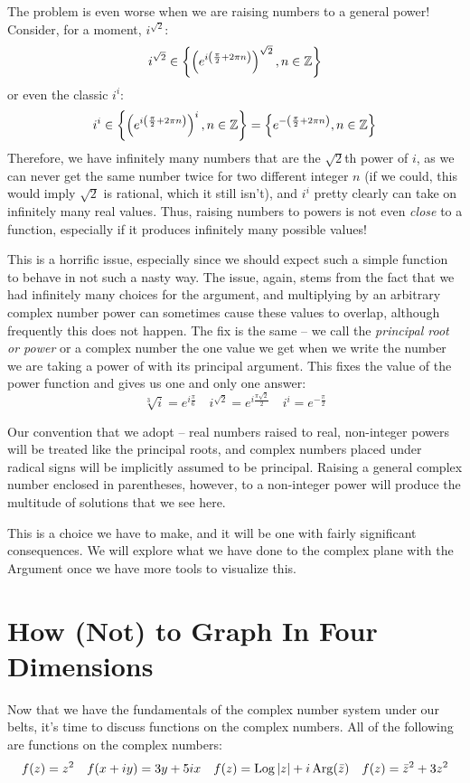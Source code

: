 The problem is even worse when we are raising numbers to a general power! Consider, for a moment, $i^{\sqrt{2}}$:
\[
    i^{\sqrt{2}} \in \left\{ \left(e^{i \left(\frac{\pi}{2} + 2\pi n \right) } \right)^{\sqrt{2}}, n \in \mathbb Z \right\}
\]
or even the classic $i^i$:
\[
    i^i \in \left\{ \left(e^{i \left(\frac{\pi}{2} + 2\pi n \right) } \right)^i, n \in \mathbb Z \right\} = \left\{ e^{- \left(\frac{\pi}{2} + 2\pi n \right) } , n \in \mathbb Z \right\}
\]
Therefore, we have infinitely many numbers that are the $\sqrt{2}$th power of $i$, as we can never get the same number twice for two different integer $n$ (if we could, this would imply $\sqrt{2}$ is rational, which it still isn't), and $i^i$ pretty clearly can take on infinitely many real values. Thus, raising numbers to powers is not even \textit{close} to a function, especially if it produces infinitely many possible values!

This is a horrific issue, especially since we should expect such a simple function to behave in not such a nasty way. The issue, again, stems from the fact that we had infinitely many choices for the argument, and multiplying by an arbitrary complex number power can sometimes cause these values to overlap, although frequently this does not happen. The fix is the same -- we call the \textit{principal root or power} or a complex number the one value we get when we write the number we are taking a power of with its principal argument. This fixes the value of the power function and gives us one and only one answer:
\[
    \sqrt[3]{i} = e^{i \frac{\pi}{6}} \quad i^{\sqrt{2}} = e^{i \frac{\pi \sqrt{2}}{2}} \quad i^i = e^{-\frac{\pi}{2}}
\]

Our convention that we adopt -- real numbers raised to real, non-integer powers will be treated like the principal roots, and complex numbers placed under radical signs will be implicitly assumed to be principal. Raising a general complex number enclosed in parentheses, however, to a non-integer power will produce the multitude of solutions that we see here.

This is a choice we have to make, and it will be one with fairly significant consequences. We will explore what we have done to the complex plane with the Argument once we have more tools to visualize this.


\section{How (Not) to Graph In Four Dimensions}
Now that we have the fundamentals of the complex number system under our belts, it's time to discuss functions on the complex numbers. All of the following are functions on the complex numbers:
\[
    f(z) = z^2 \quad f(x+iy) = 3y + 5ix \quad f(z) = \operatorname*{Log} |z| + i \operatorname*{Arg}(\bar{z}) \quad f(z) = \bar{z}^2 + 3z^2
\]

